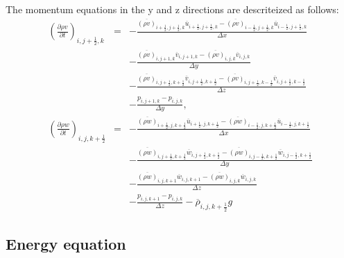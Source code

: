 The momentum equations in the y and z directions are descriteized as follows:
\begin{eqnarray}
\left(\frac{\partial \rho v}{\partial t}\right)_{i,j+\frac{1}{2},k}
&=& - \frac{\overline{(\rho v)}_{i+\frac{1}{2},j+\frac{1}{2},k}  \overline{u}_{i+\frac{1}{2},j+\frac{1}{2},k} 
           -\overline{(\rho v)}_{i-\frac{1}{2},j+\frac{1}{2},k}  \overline{u}_{i-\frac{1}{2},j+\frac{1}{2},k}}
     {\Delta x}\nonumber\\
& & - \frac{\overline{(\rho v)}_{i,j+1,k} \overline{v}_{i,j+1,k} 
           -\overline{(\rho v)}_{i,j,k} \overline{v}_{i,j,k}}
     {\Delta y}\nonumber\\
& & - \frac{\overline{(\rho v)}_{i,j+\frac{1}{2},k+\frac{1}{2}}  \overline{v}_{i,j+\frac{1}{2},k+\frac{1}{2}} 
           -\overline{(\rho v)}_{i,j+\frac{1}{2},k-\frac{1}{2}}  \overline{v}_{i,j+\frac{1}{2},k-\frac{1}{2}}}
     {\Delta z}\nonumber\\
& & -\frac{p_{i,j+1,k}-p_{i,j,k}}{\Delta y},\\
\left(\frac{\partial \rho w}{\partial t}\right)_{i,j,k+\frac{1}{2}}
&=& - \frac{\overline{(\rho w)}_{i+\frac{1}{2},j,k+\frac{1}{2}}  \overline{u}_{i+\frac{1}{2},j,k+\frac{1}{2}} 
           -\overline{(\rho w)}_{i-\frac{1}{2},j,k+\frac{1}{2}}  \overline{u}_{i-\frac{1}{2},j,k+\frac{1}{2}}}
     {\Delta x}\nonumber\\
& & - \frac{\overline{(\rho w)}_{i,j+\frac{1}{2},k+\frac{1}{2}}  \overline{w}_{i,j+\frac{1}{2},k+\frac{1}{2}} 
           -\overline{(\rho w)}_{i,j-\frac{1}{2},k+\frac{1}{2}}  \overline{w}_{i,j-\frac{1}{2},k+\frac{1}{2}}}
     {\Delta y}\nonumber\\
& & - \frac{\overline{(\rho w)}_{i,j,k+1} \overline{w}_{i,j,k+1} 
           -\overline{(\rho w)}_{i,j,k} \overline{w}_{i,j,k}}
     {\Delta z}\nonumber\\
& & -\frac{p_{i,j,k+1}-p_{i,j,k}}{\Delta z}-\overline{\rho}_{i,j,k+\frac{1}{2}} g
\end{eqnarray}

\subsection{Energy equation}


